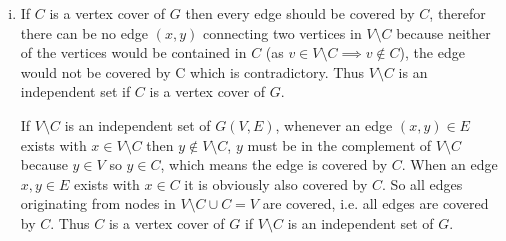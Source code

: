 \begin{enumerate}[(i)]
	\item If $C$ is a vertex cover of $G$ then every edge should be covered by $C$, therefor there can be no edge $(x,y)$ connecting two vertices in $V \setminus C$ because neither of the vertices would be contained in $C$ (as $v \in V \setminus C \implies v \not \in C$), the edge would not be covered by C which is contradictory. Thus $V \setminus C$ is an independent set if $C$ is a vertex cover of $G$.

If $V \setminus C$ is an independent set of $G(V,E)$, whenever an edge $(x,y) \in E$ exists with $x \in V \setminus C$ then $y \not \in V \setminus C$, $y$ must be in the complement of $V \setminus C$ because $y \in V$ so $y \in C$, which means the edge is covered by $C$. When an edge $x,y \in E$ exists with $x \in C$ it is obviously also covered by $C$. So all edges originating from nodes in $V \setminus C \cup C = V$ are covered, i.e. all edges are covered by $C$. Thus $C$ is a vertex cover of $G$ if $V \setminus C$ is an independent set of $G$.


\end{enumerate}
